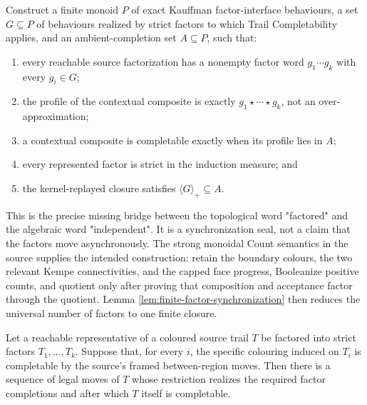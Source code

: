 \begin{proposition}
\label{prop:factor-product-semantics}
\Sopen
Construct a finite monoid $P$ of exact Kauffman factor-interface behaviours,
a set $G\subseteq P$ of behaviours realized by strict factors to which Trail
Completability applies, and an ambient-completion set $A\subseteq P$, such
that:
\begin{enumerate}
  \item every reachable source factorization has a nonempty factor word
        $g_1\cdots g_k$ with every $g_i\in G$;
  \item the profile of the contextual composite is exactly
        $g_1\star\cdots\star g_k$, not an over-approximation;
  \item a contextual composite is completable exactly when its profile lies
        in $A$;
  \item every represented factor is strict in the induction measure; and
  \item the kernel-replayed closure satisfies
        $\langle G\rangle_{+}\subseteq A$.
\end{enumerate}
\end{proposition}

This is the precise missing bridge between the topological word
"factored" and the algebraic word "independent".  It is a synchronization
seal, not a claim that the factors move asynchronously.  The strong monoidal
Count semantics in the source supplies the intended construction: retain the
boundary colours, the two relevant Kempe connectivities, and the capped face
progress, Booleanize positive counts, and quotient only after proving that
composition and acceptance factor through the quotient.  Lemma
\ref{lem:finite-factor-synchronization} then reduces the universal number of
factors to one finite closure.

\begin{proposition}
\label{prop:factor-completion-lifts}
Let a reachable representative of a coloured source trail $T$ be factored
into strict factors $T_1,\ldots,T_k$.  Suppose that, for every $i$, the
specific colouring induced on $T_i$ is completable by the source's framed
between-region moves.  Then there is a sequence of legal moves of $T$ whose
restriction realizes the required factor completions and after which $T$
itself is completable.
\end{proposition}

